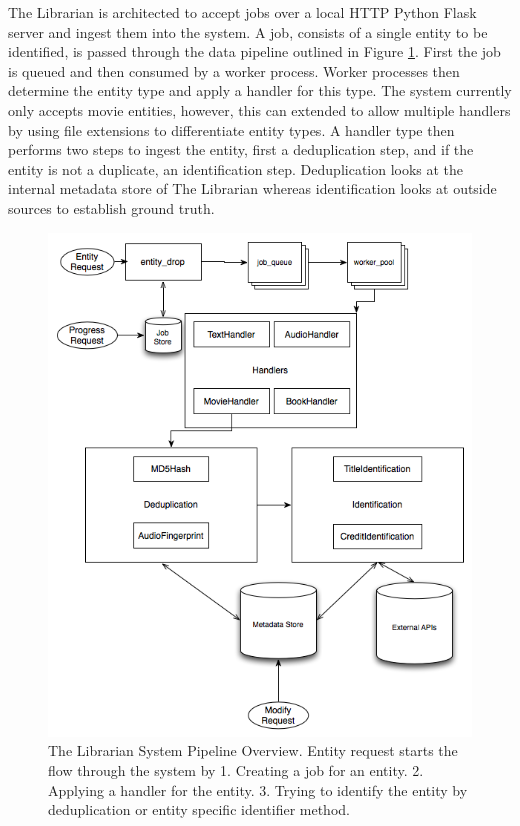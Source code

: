 \documentclass[paper=a4, fontsize=11pt]{scrartcl} %
\numberwithin{equation}{section} %
\numberwithin{figure}{section} %
\numberwithin{table}{section} %
\begin{document}
The Librarian is architected to accept jobs over a local HTTP Python Flask server and ingest them into the system. A job,  consists of a single entity to be identified, is passed through the data pipeline outlined in Figure \ref{fig:system-overview}. First the job is queued and then consumed by a worker process. Worker processes then determine the entity type and apply a handler for this type. The system currently only accepts movie entities, however, this can extended to allow multiple handlers by using file extensions to differentiate entity types. A handler type then performs two steps to ingest the entity, first a deduplication step, and if the entity is not a duplicate, an identification step. Deduplication looks at the internal metadata store of The Librarian whereas identification looks at outside sources to establish ground truth. \\


\begin{figure}[H]
\center\includegraphics[scale=0.75]{system-overview.png}
\caption{The Librarian System Pipeline Overview. Entity request starts the flow through the system by 1. Creating a job for an entity. 2. Applying a handler for the entity. 3. Trying to identify the entity by deduplication or entity specific identifier method.}
\label{fig:system-overview}
\end{figure}
\end{document}

